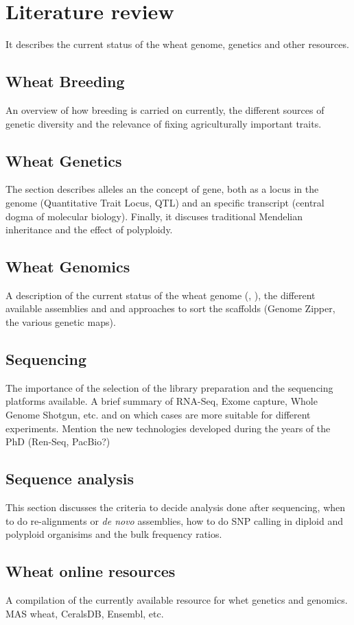 
\chapter{Literature review}
It describes the current status of the wheat genome, genetics and other resources.   

\section{Wheat Breeding}
An overview of how breeding is carried on currently, the different sources of genetic diversity and the relevance of fixing agriculturally important traits. 
\section{Wheat Genetics}
The section describes alleles an the concept of gene, both as a locus in the genome (Quantitative Trait Locus, QTL) and an specific transcript (central dogma of molecular biology). Finally, it discuses traditional Mendelian inheritance and the effect of polyploidy.  
\section{Wheat Genomics}
A description of the current status of the wheat genome (\citet{Mayer2014}, \citet{Chapman2015}), the different available assemblies and and approaches to sort the scaffolds (Genome Zipper, the various genetic maps).  
\section{Sequencing} 
The importance of the selection of the library preparation and the sequencing platforms available. A brief summary of RNA-Seq, Exome capture, Whole Genome Shotgun, etc. and on which cases are more suitable for different experiments.  Mention the new technologies developed during the years of the PhD (Ren-Seq, PacBio?)
\section{Sequence analysis}
This section discusses the criteria to decide analysis done after sequencing, when to do re-alignments or \textit{de novo} assemblies, how to do SNP calling in diploid and polyploid organisims and the bulk frequency ratios.  
\section{Wheat online resources}
A compilation of the currently available resource for whet genetics and genomics. MAS wheat, CeralsDB, Ensembl, etc.  
